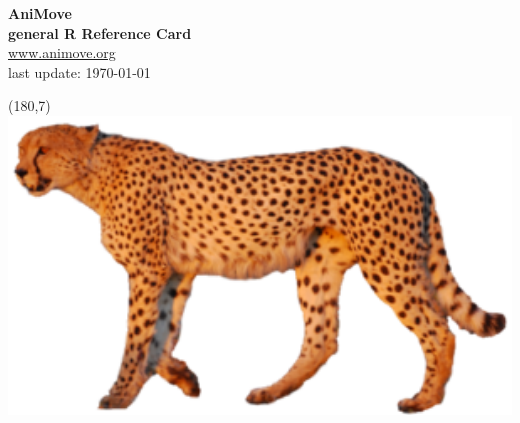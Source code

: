 \documentclass[8pt,landscape]{article}
\begin{document}
\begin{center}
 
 {\Large{\textbf{\color{blue}AniMove\\ \smallskip general R Reference Card}}} \\ \url{www.animove.org}\\
 last update: \today
 \end{center}

% 
   \begin{textblock}{20}(180,7)
      \includegraphics[width=3.8\textwidth]{pics/earth-observation_org_WegmannBevanda_cheeta.png}
    \end{textblock}
 
\bigskip
\end{document}
